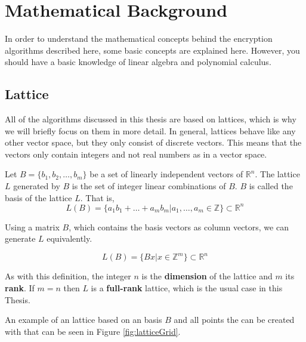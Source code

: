 \chapter{Mathematical Background}
\label{MathBack}

In order to understand the mathematical concepts behind the encryption algorithms described here, some basic concepts are explained here. However, you should have a basic knowledge of linear algebra and polynomial calculus.

\section{Lattice}


All of the algorithms discussed in this thesis are based on lattices, which is why we will briefly focus on them in more detail. In general, lattices behave like any other vector space, but they only consist of discrete vectors. This means that the vectors only contain integers and not real numbers as in a vector space.

Let $B = \{b_1, b_2, \ldots, b_m\}$ be a set of linearly independent vectors of $\mathbb{R}^n$. The lattice $L$ generated by $B$ is the set of integer linear combinations of $B$. $B$ is called the basis of the lattice $L$. That is,
$$L(B) = \{a_1b_1 + \ldots + a_mb_m | a_1, \ldots, a_m \in \mathbb{Z}  \} \subset \mathbb{R}^n$$


Using a matrix $B$, which contains the basis vectors as column vectors, we can generate $L$ equivalently.

$$L(B) = \{Bx | x \in \mathbb{Z}^m  \} \subset \mathbb{R}^n$$

As with this definition, the integer $n$ is the \textbf{dimension} of the lattice and $m$ its \textbf{rank}. If $m = n$ then $L$ is a \textbf{full-rank} lattice, which is the usual case in this Thesis.

An example of an lattice based on an basis $B$ and all points the can be created with that can be seen in Figure \ref{fig:latticeGrid}.

